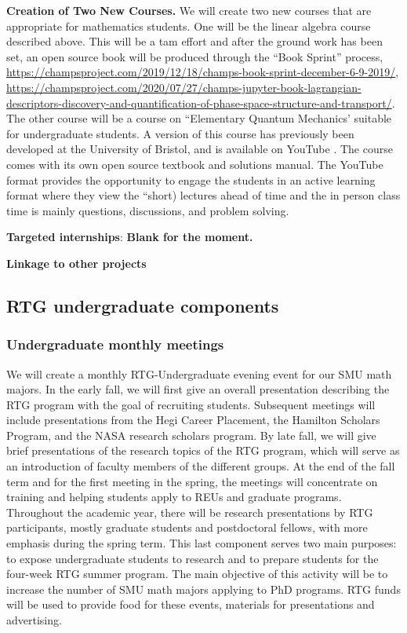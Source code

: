 \documentclass[11pt]{article}
\begin{document}
\noindent
{\bf Creation of Two New Courses. }We will create two new courses that are appropriate for mathematics students. One will be the linear algebra course described above. This will be a tam effort and after the ground work has been set, an open source book will be produced through the “Book Sprint” process, \url{https://champsproject.com/2019/12/18/champs-book-sprint-december-6-9-2019/}, \url{https://champsproject.com/2020/07/27/champs-jupyter-book-lagrangian-descriptors-discovery-and-quantification-of-phase-space-structure-and-transport/}.
The other course will be a course on  “Elementary Quantum Mechanics’ suitable for undergraduate students. A version of this course has previously been developed at the University of Bristol, and is available on YouTube \cite{https://www.youtube.com/playlist?list=PL6hB9Fh0Z1ELQy4WdFzlMcMD_XIb7C3no}.
The course comes with its own open source textbook and solutions manual. The YouTube format provides the opportunity to engage the students in an active learning format where they view the “short) lectures ahead of time and the in person class time  is mainly questions, discussions, and problem solving.

\medskip

\noindent
{\bf Targeted internships}: {\bf Blank for the moment.}

\medskip
\noindent
{\bf Linkage to other projects}



\subsection{RTG undergraduate components}

\subsubsection{Undergraduate monthly meetings}
We will create a monthly RTG-Undergraduate evening event for our SMU math majors. In the early fall,
we will first give an overall presentation describing the RTG program with the goal of recruiting students.
Subsequent meetings will include presentations from the Hegi Career Placement, the Hamilton Scholars
Program, and the NASA research scholars program. By late fall, we will give brief presentations of the
research topics of the RTG program, which will serve as an introduction of faculty members of the different
groups. At the end of the fall term and for the first meeting in the spring, the meetings will concentrate on
training and helping students apply to REUs and graduate programs. Throughout the academic year, there
will be research presentations by RTG participants, mostly graduate students and postdoctoral fellows, with
more emphasis during the spring term. This last component serves two main purposes: to expose undergraduate
students to research and to prepare students for the four-week RTG summer program. The main
objective of this activity will be to increase the number of SMU math majors applying to PhD programs.
RTG funds will be used to provide food for these events, materials for presentations and advertising.
\end{document}
